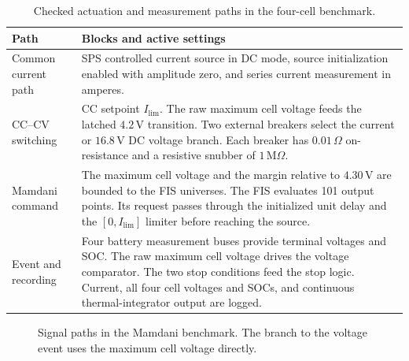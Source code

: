 \documentclass[a4paper,10pt,twocolumn]{article}
\begin{document}
\begin{table}[t]
\centering\small
\caption{Checked actuation and measurement paths in the four-cell benchmark.}
\label{tab:paths}
\begin{tabular}{@{}p{}p{}@{}}
\toprule
Path & Blocks and active settings\\
\midrule
Common current path & SPS controlled current source in DC mode, source initialization enabled with amplitude zero, and series current measurement in amperes.\\
CC--CV switching & CC setpoint $I_{\mathrm{lim}}$. The raw maximum cell voltage feeds the latched $4.2\,\mathrm{V}$ transition. Two external breakers select the current or $16.8\,\mathrm{V}$ DC voltage branch. Each breaker has $0.01\,\Omega$ on-resistance and a resistive snubber of $1\,\mathrm{M}\Omega$.\\
Mamdani command & The maximum cell voltage and the margin relative to $4.30\,\mathrm{V}$ are bounded to the FIS universes. The FIS evaluates 101 output points. Its request passes through the initialized unit delay and the $[0,I_{\mathrm{lim}}]$ limiter before reaching the source.\\
Event and recording & Four battery measurement buses provide terminal voltages and SOC. The raw maximum cell voltage drives the voltage comparator. The two stop conditions feed the stop logic. Current, all four cell voltages and SOCs, and continuous thermal-integrator output are logged.\\
\bottomrule
\end{tabular}
\end{table}

\begin{figure}[H]
\centering
{}
\caption{Signal paths in the Mamdani benchmark. The branch to the voltage event uses the maximum cell voltage directly.}
\label{fig:architecture}
\end{figure}
\end{document}
